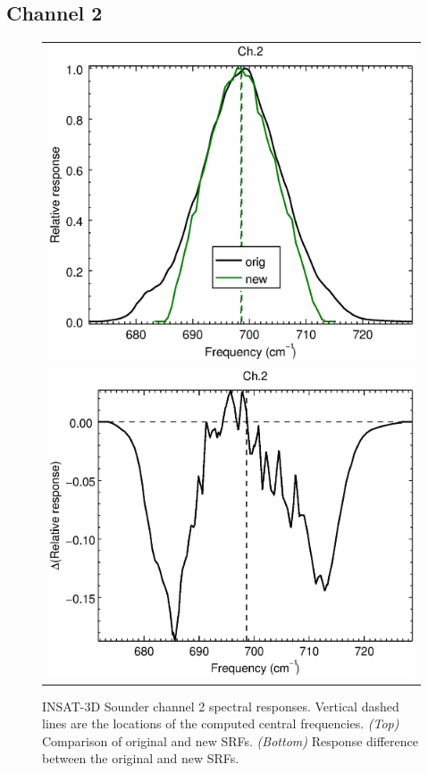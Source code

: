 \subsection{Channel 2}
\begin{figure}[H]
  \centering
  \begin{tabular}{c}
    \includegraphics[scale=0.55]{graphics/sndr/srf/sndr_insat3d-2.eps} \\
    \includegraphics[scale=0.55]{graphics/sndr/srf/sndr_insat3d-2.difference.eps}
  \end{tabular}
  \caption{INSAT-3D Sounder channel 2 spectral responses. Vertical dashed lines are the locations of the computed central frequencies. \emph{(Top)} Comparison of original and new SRFs. \emph{(Bottom)} Response difference between the original and new SRFs.}
  \label{fig:sndr_ch2}
\end{figure}


